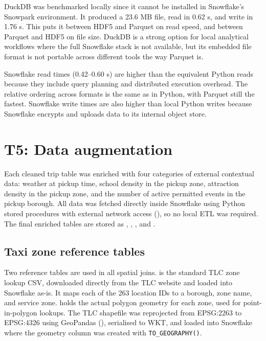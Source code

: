 \documentclass[fleqn,moreauthors,9pt]{ds_report}
\begin{document}
DuckDB was benchmarked locally since it cannot be installed in Snowflake's Snowpark environment. It produced a 23.6 MB file, read in 0.62 s, and write in 1.76 s. This puts it between HDF5 and Parquet on read speed, and between Parquet and HDF5 on file size. DuckDB is a strong option for local analytical workflows where the full Snowflake stack is not available, but its embedded file format is not portable across different tools the way Parquet is.

Snowflake read times (0.42--0.60 s) are higher than the equivalent Python reads because they include query planning and distributed execution overhead. The relative ordering across formats is the same as in Python, with Parquet still the fastest. Snowflake write times are also higher than local Python writes because Snowflake encrypts and uploads data to its internal object store.



\section*{T5: Data augmentation}

Each cleaned trip table was enriched with four categories of external contextual data: weather at pickup time, school density in the pickup zone, attraction density in the pickup zone, and the number of active permitted events in the pickup borough. All data was fetched directly inside Snowflake using Python stored procedures with external network access (), so no local ETL was required. The final enriched tables are stored as , , , and .

\subsection*{Taxi zone reference tables}

Two reference tables are used in all spatial joins.  is the standard TLC zone lookup CSV, downloaded directly from the TLC website and loaded into Snowflake as-is. It maps each of the 263 location IDs to a borough, zone name, and service zone.  holds the actual polygon geometry for each zone, used for point-in-polygon lookups. The TLC shapefile was reprojected from EPSG:2263 to EPSG:4326 using GeoPandas (), serialised to WKT, and loaded into Snowflake where the geometry column was created with \texttt{TO\_GEOGRAPHY()}.
\end{document}
